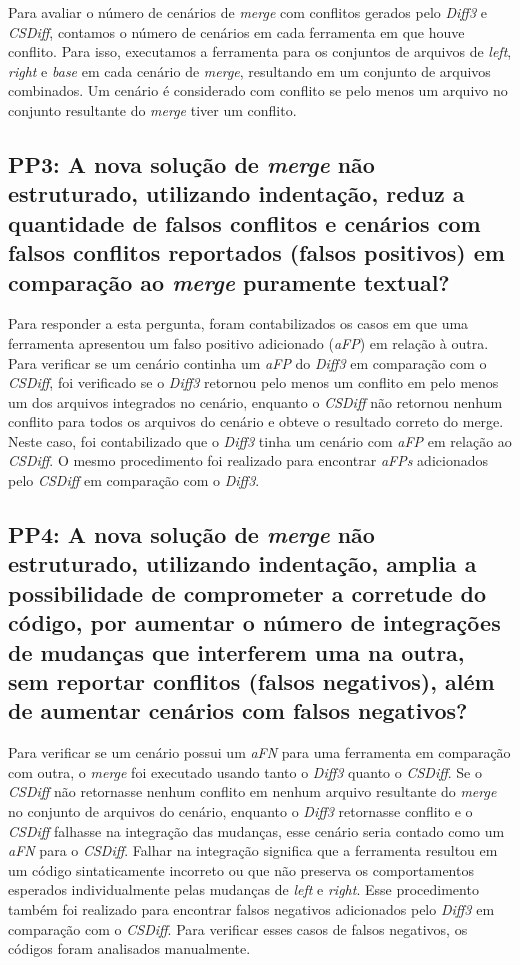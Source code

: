 Para avaliar o número de cenários de \emph{merge} com conflitos gerados pelo
\emph{Diff3} e \emph{CSDiff}, contamos o número de cenários em cada ferramenta
em que houve conflito. Para isso, executamos a ferramenta para os conjuntos de
arquivos de \emph{left}, \emph{right} e \emph{base} em cada cenário de
\emph{merge}, resultando em um conjunto de arquivos combinados. Um cenário é
considerado com conflito se pelo menos um arquivo no conjunto resultante do
\emph{merge} tiver um conflito.

\subsection{PP3: A nova solução de \emph{merge} não estruturado, utilizando
	indentação, reduz a quantidade de falsos conflitos e cenários com falsos
	conflitos reportados (falsos positivos) em comparação ao \emph{merge} puramente
	textual?}

Para responder a esta pergunta, foram contabilizados os casos em que uma
ferramenta apresentou um falso positivo adicionado (\emph{aFP}) em relação à
outra. Para verificar se um cenário continha um \emph{aFP} do \emph{Diff3} em
comparação com o \emph{CSDiff}, foi verificado se o \emph{Diff3} retornou pelo
menos um conflito em pelo menos um dos arquivos integrados no cenário, enquanto
o \emph{CSDiff} não retornou nenhum conflito para todos os arquivos do cenário
e obteve o resultado correto do merge. Neste caso, foi contabilizado que o
\emph{Diff3} tinha um cenário com \emph{aFP} em relação ao \emph{CSDiff}. O
mesmo procedimento foi realizado para encontrar \emph{aFPs} adicionados pelo
\emph{CSDiff} em comparação com o \emph{Diff3}.

\subsection{PP4: A nova solução de \emph{merge} não estruturado, utilizando
	indentação, amplia a possibilidade de comprometer a corretude do código,
	por aumentar o número de integrações de mudanças que interferem uma na
	outra, sem reportar conflitos (falsos negativos), além de aumentar cenários
	com falsos negativos?}

Para verificar se um cenário possui um \emph{aFN} para uma ferramenta em
comparação com outra, o \emph{merge} foi executado usando tanto o \emph{Diff3}
quanto o \emph{CSDiff}. Se o \emph{CSDiff} não retornasse nenhum conflito em
nenhum arquivo resultante do \emph{merge} no conjunto de arquivos do cenário,
enquanto o \emph{Diff3} retornasse conflito e o \emph{CSDiff} falhasse na
integração das mudanças, esse cenário seria contado como um \emph{aFN} para o
\emph{CSDiff}. Falhar na integração significa que a ferramenta resultou em um
código sintaticamente incorreto ou que não preserva os comportamentos esperados
individualmente pelas mudanças de \emph{left} e \emph{right}. Esse procedimento
também foi realizado para encontrar falsos negativos adicionados pelo
\emph{Diff3} em comparação com o \emph{CSDiff}. Para verificar esses casos de
falsos negativos, os códigos foram analisados manualmente.


